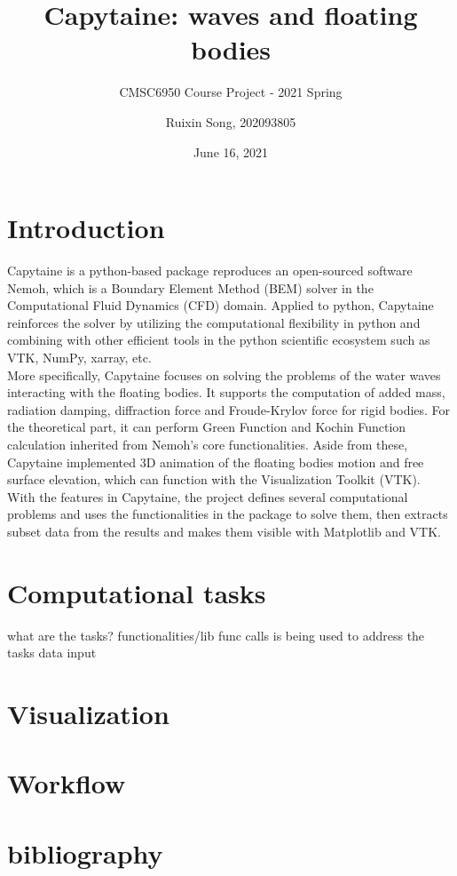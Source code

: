 \documentclass{article}
\title{Capytaine: waves and floating bodies}
\subtitle{CMSC6950 Course Project - 2021 Spring}
\author{Ruixin Song, 202093805}
\date{June 16, 2021}
\begin{document}
\maketitle

\section{Introduction}
Capytaine is a python-based package reproduces an open-sourced software Nemoh, which is a Boundary Element Method (BEM) solver in the Computational Fluid Dynamics (CFD) domain. Applied to python, Capytaine reinforces the solver by utilizing the computational flexibility in python and combining with other efficient tools in the python scientific ecosystem such as VTK, NumPy, xarray, etc. \\

More specifically, Capytaine focuses on solving the problems of the water waves interacting with the floating bodies. It supports the computation of added mass, radiation damping, diffraction force and Froude-Krylov force for rigid bodies. For the theoretical part, it can perform Green Function and Kochin Function calculation inherited from Nemoh's core functionalities. Aside from these, Capytaine implemented 3D animation of the floating bodies motion and free surface elevation, which can function with the Visualization Toolkit (VTK).\\

With the features in Capytaine, the project defines several computational problems and uses the functionalities in the package to solve them, then extracts subset data from the results and makes them visible with Matplotlib and VTK.

\section{Computational tasks}
what are the tasks?
functionalities/lib func calls is being used to address the tasks
data input

\section{Visualization}
\section{Workflow}
\section{bibliography}
\end{document}
